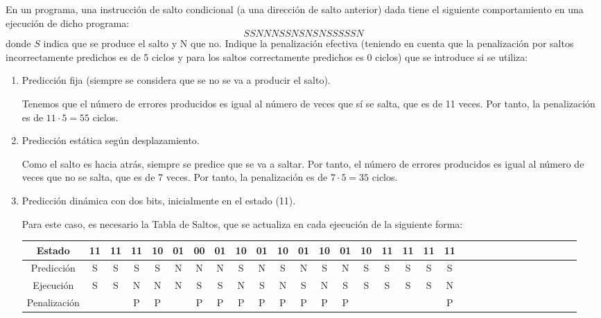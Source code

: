 \begin{ejercicio}
En un programa, una instrucción de salto condicional (a una dirección de salto anterior) dada tiene el siguiente comportamiento en una ejecución de dicho programa:    
\begin{equation*}
    SSNNNSSNSNSNSSSSSN
\end{equation*}
donde $S$ indica que se produce el salto y N que no. Indique la penalización efectiva (teniendo en cuenta que la penalización por saltos incorrectamente predichos es de 5 ciclos y para los saltos correctamente predichos es 0 ciclos) que se introduce si se utiliza:
\begin{enumerate}
    \item Predicción fija (siempre se considera que se no se va a producir el salto).
    
    Tenemos que el número de errores producidos es igual al número de veces que sí se salta, que es de 11 veces. Por tanto, la penalización es de $11\cdot 5 = 55$ ciclos.
    \item Predicción estática según desplazamiento.
    
    Como el salto es hacia atrás, siempre se predice que se va a saltar.
    Por tanto, el número de errores producidos es igual al número de veces que no se salta, que es de 7 veces. Por tanto, la penalización es de $7\cdot 5 = 35$ ciclos.
    \item Predicción dinámica con dos bits, inicialmente en el estado (11).
    
    Para este caso, es necesario la Tabla de Saltos, que se actualiza en cada ejecución de la siguiente forma:
    \begin{center}
        \scriptsize
        \begin{tabular}{|c|c|c|c|c|c|c|c|c|c|c|c|c|c|c|c|c|c|c|c|c|c|c|c|c|c|c|c|c|c|c|}
            \hline
            Estado & 11 & 11 & 11 & 10 & 01 & 00 & 01 & 10 & 01 & 10 & 01 & 10 & 01 & 10 & 11 & 11 & 11 & 11 
            \\ \hline
            Predicción & S & S & S & S & N & N & N & S & N & S & N & S & N & S & S & S & S & S 
            \\ \hline
            Ejecución  & S & S & N & N & N & S & S & N & S & N & S & N & S & S & S & S & S & N \\ \hline
            Penalización & &   & P & P &   & P & P & P & P & P & P & P & P &   &   &   &   & P \\ \hline
        \end{tabular}
    \end{center}


\end{enumerate}
\end{ejercicio}
